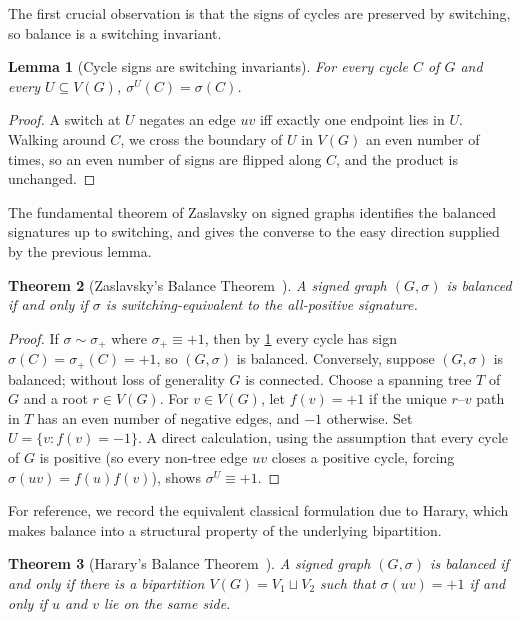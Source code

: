 \documentclass[11pt,a4paper]{article}
\theoremstyle{plain}
\newtheorem{theorem}{Theorem}[section]
\newtheorem{lemma}[theorem]{Lemma}
\theoremstyle{definition}
\newcommand{\V}{V}
\newcommand{\Gs}{(G,\sigma)}
\begin{document}
The first crucial observation is that the signs of cycles are
preserved by switching, so balance is a switching invariant.

\begin{lemma}[Cycle signs are switching invariants]\label{lem:cycle-invariant}
For every cycle $C$ of $G$ and every $U\subseteq\V(G)$,
$\sigma^U(C)=\sigma(C)$.
\end{lemma}

\begin{proof}
A switch at $U$ negates an edge $uv$ iff exactly one endpoint lies
in $U$. Walking around $C$, we cross the boundary of $U$ in $\V(G)$
an even number of times, so an even number of signs are flipped
along $C$, and the product is unchanged.
\end{proof}

The fundamental theorem of Zaslavsky on signed graphs identifies
the balanced signatures up to switching, and gives the converse to
the easy direction supplied by the previous lemma.

\begin{theorem}[Zaslavsky's Balance Theorem~\cite{Zaslavsky1982}]\label{thm:zaslavsky-balance}
A signed graph $\Gs$ is balanced if and only if $\sigma$ is
switching-equivalent to the all-positive signature.
\end{theorem}

\begin{proof}
If $\sigma\sim\sigma_+$ where $\sigma_+\equiv+1$, then by
\cref{lem:cycle-invariant} every cycle has sign
$\sigma(C)=\sigma_+(C)=+1$, so $\Gs$ is balanced. Conversely,
suppose $\Gs$ is balanced; without loss of generality $G$ is
connected. Choose a spanning tree $T$ of $G$ and a root $r\in\V(G)$.
For $v\in\V(G)$, let $f(v)=+1$ if the unique $r$--$v$ path in $T$
has an even number of negative edges, and $-1$ otherwise. Set
$U=\{v:f(v)=-1\}$. A direct calculation, using the assumption that
every cycle of $G$ is positive (so every non-tree edge $uv$ closes
a positive cycle, forcing $\sigma(uv)=f(u)f(v)$), shows
$\sigma^U\equiv+1$.
\end{proof}

For reference, we record the equivalent classical formulation due
to Harary, which makes balance into a structural property of the
underlying bipartition.

\begin{theorem}[Harary's Balance Theorem~\cite{Harary1953}]\label{thm:harary}
A signed graph $\Gs$ is balanced if and only if there is a
bipartition $\V(G)=V_1\sqcup V_2$ such that $\sigma(uv)=+1$ if and
only if $u$ and $v$ lie on the same side.
\end{theorem}
\end{document}
